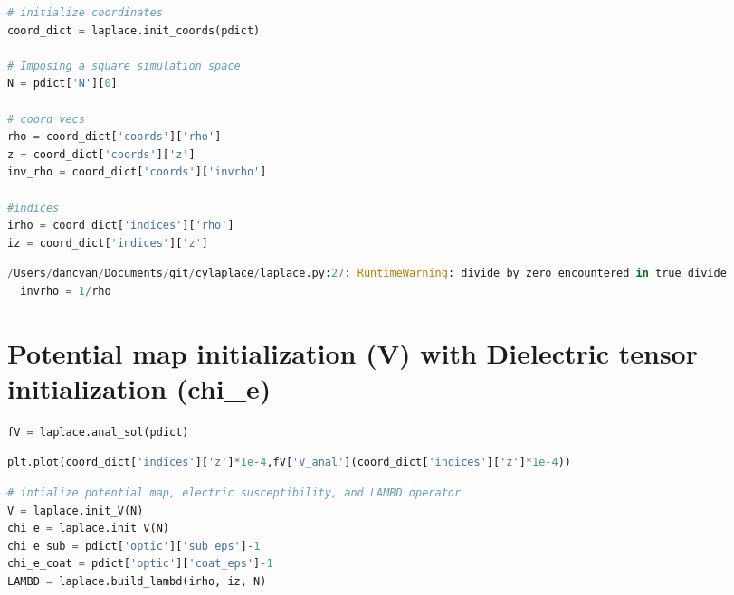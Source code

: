 \begin{spacing}{1} \begin{lstlisting}[frame=single, language=Python]
# initialize coordinates
coord_dict = laplace.init_coords(pdict) 

# Imposing a square simulation space
N = pdict['N'][0]

# coord vecs
rho = coord_dict['coords']['rho']
z = coord_dict['coords']['z']
inv_rho = coord_dict['coords']['invrho']

#indices 
irho = coord_dict['indices']['rho']
iz = coord_dict['indices']['z']
\end{lstlisting} \end{spacing}

\begin{spacing}{1} \begin{lstlisting}[frame=single, language=Python]
/Users/dancvan/Documents/git/cylaplace/laplace.py:27: RuntimeWarning: divide by zero encountered in true_divide
  invrho = 1/rho
\end{lstlisting} \end{spacing}

\hypertarget{potential-map-initialization-v-with-dielectric-tensor-initialization-chi_e}{%
\section{Potential map initialization (V) with Dielectric tensor
initialization
(chi\_e)}\label{potential-map-initialization-v-with-dielectric-tensor-initialization-chi_e}}

\begin{spacing}{1} \begin{lstlisting}[frame=single, language=Python]
fV = laplace.anal_sol(pdict)
\end{lstlisting} \end{spacing}

\begin{spacing}{1} \begin{lstlisting}[frame=single, language=Python]
plt.plot(coord_dict['indices']['z']*1e-4,fV['V_anal'](coord_dict['indices']['z']*1e-4))
\end{lstlisting} \end{spacing}

\begin{spacing}{1} \begin{lstlisting}[frame=single, language=Python]
# intialize potential map, electric susceptibility, and LAMBD operator
V = laplace.init_V(N)
chi_e = laplace.init_V(N)
chi_e_sub = pdict['optic']['sub_eps']-1
chi_e_coat = pdict['optic']['coat_eps']-1
LAMBD = laplace.build_lambd(irho, iz, N)
\end{lstlisting} \end{spacing}

